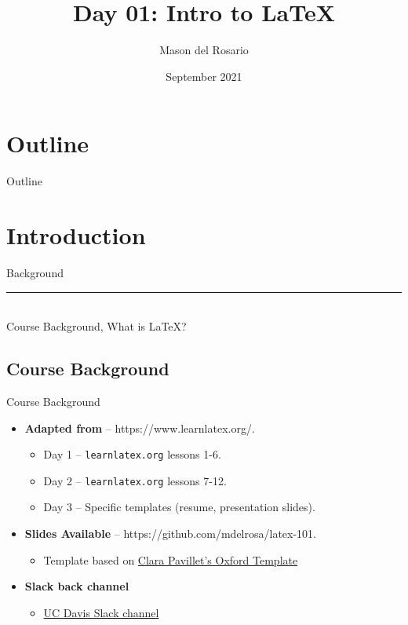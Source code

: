 \documentclass{beamer}
\title{Day 01: Intro to \LaTeX }
\author{\small{Mason del Rosario}}
\institute{\LaTeX 101}
\date{September 2021} %
\begin{document}
\footnotesize{
% 


{ 
\frame{\titlepage}}

\section*{Outline}\begin{frame}{Outline}\tableofcontents\end{frame}

\section{Introduction}

  \begin{frame}[plain]
    \vfill
    \centering
    \begin{beamercolorbox}[sep=8pt,center,shadow=true,rounded=true]{Background}
      \insertsectionhead\par%
      \color{davisblue}\noindent\rule{10cm}{1pt} \\
      \footnotesize{Course Background, What is \LaTeX?}
    \end{beamercolorbox}
    \vfill
  \end{frame}
  
\subsection{Course Background}

  \begin{frame}{Course Background}
    \begin{itemize} 
      \item \textbf{Adapted from} -- https://www.learnlatex.org/. 
        \begin{itemize}
          \item Day 1 -- \texttt{learnlatex.org} lessons 1-6.
          \item Day 2 -- \texttt{learnlatex.org} lessons 7-12.
          \item Day 3 -- Specific templates (resume, presentation slides).
        \end{itemize}
      \item \textbf{Slides Available} -- https://github.com/mdelrosa/latex-101.
      \begin{itemize}
        \item Template based on \href{https://www.overleaf.com/latex/templates/oxpav/xnjgrxthvjhg}{Clara Pavillet's Oxford Template}
      \end{itemize}
      \item \textbf{Slack back channel}
      \begin{itemize}
        \item \href{https://join.slack.com/share/zt-ul82okyc-SI2GftuwPx_lFyBXll9rjw}{UC Davis Slack channel}
      \end{itemize}
    \end{itemize}
  \end{frame}

}
\end{document}
